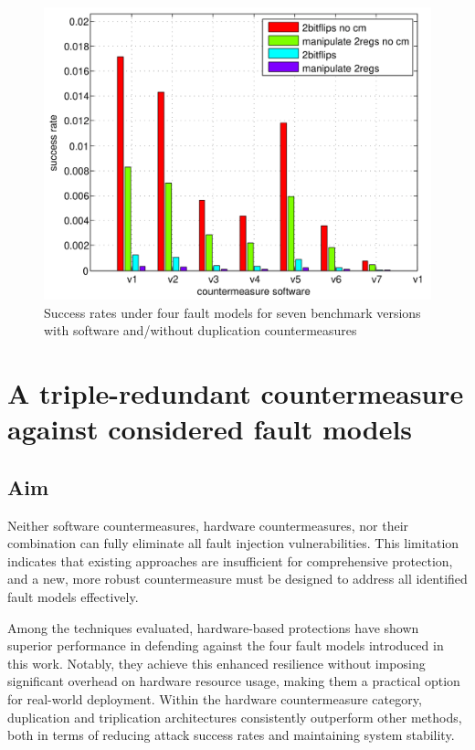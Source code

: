 \begin{figure}[t!]
  \centering
  \includegraphics[width=0.99\linewidth]{Chapitre4/figures/duplication.png}
  \caption{Success rates under four fault models for seven benchmark versions with software and/without duplication countermeasures}
  \label{hwsw combine}
\end{figure}

\section{A triple-redundant countermeasure against considered fault models}

\subsection{Aim}
Neither software countermeasures, hardware countermeasures, nor their combination can fully eliminate all fault injection vulnerabilities. This limitation indicates that existing approaches are insufficient for comprehensive protection, and a new, more robust countermeasure must be designed to address all identified fault models effectively.

Among the techniques evaluated, hardware-based protections have shown superior performance in defending against the four fault models introduced in this work. Notably, they achieve this enhanced resilience without imposing significant overhead on hardware resource usage, making them a practical option for real-world deployment. Within the hardware countermeasure category, duplication and triplication architectures consistently outperform other methods, both in terms of reducing attack success rates and maintaining system stability.

